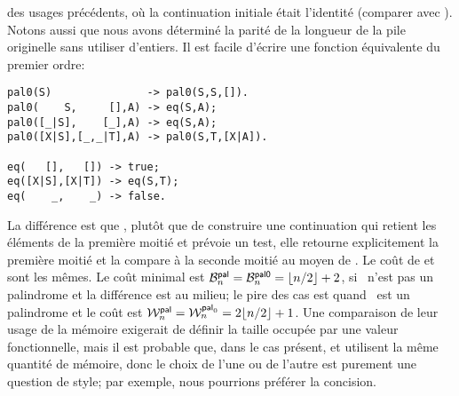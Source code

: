 des usages précédents, où la continuation initiale était l'identité
(comparer avec ). Notons aussi que nous avons déterminé
la parité de la longueur de la pile originelle sans utiliser
d'entiers. Il est facile d'écrire une fonction équivalente du premier
ordre:
\begin{verbatim}
pal0(S)               -> pal0(S,S,[]).
pal0(    S,     [],A) -> eq(S,A);
pal0([_|S],    [_],A) -> eq(S,A);
pal0([X|S],[_,_|T],A) -> pal0(S,T,[X|A]).

eq(   [],   []) -> true;
eq([X|S],[X|T]) -> eq(S,T);
eq(    _,    _) -> false.
\end{verbatim}
La différence est que , plutôt que de construire une
continuation qui retient les éléments de la première moitié et prévoie
un test, elle retourne explicitement la première moitié et la compare
à la seconde moitié au moyen de . Le coût de
 et  sont les mêmes. Le coût minimal
est \(\B{\fun{pal}}{n} = \B{\fun{pal0}}{n} = \floor{n/2} + 2\), si
~n'est pas un palindrome et la différence est au milieu; le
pire des cas est quand ~est un palindrome et le coût est
\(\W{\fun{pal}}{n} = \W{\fun{pal}_0}{n} = 2\floor{n/2} +
1\). Une comparaison de leur usage de la mémoire
exigerait de définir la taille occupée par une valeur fonctionnelle,
mais il est probable que, dans le cas présent,  et
 utilisent la même quantité de mémoire, donc le choix
de l'une ou de l'autre est purement une question de style; par
exemple, nous pourrions préférer la concision.

